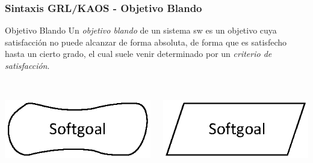 \documentclass[handout,slidestop,xcolor=pst,dvips,blue]{beamer}
\begin{document}
\begin{frame}[c]
    \frametitle{Sintaxis GRL/KAOS - Objetivo Blando}
    \begin{block}{Objetivo Blando}
        Un \alert{\emph{objetivo blando}} de un sistema sw es un objetivo cuya satisfacción no puede alcanzar de forma absoluta, de forma que es satisfecho hasta un cierto grado, el cual suele venir determinado por un \emph{criterio de satisfacción}.
        \ \\
        \ \\
        \begin{columns}[c]
            \begin{column}{0.50\linewidth}
                \centering \includegraphics[width=0.5\columnwidth,keepaspectratio=true]{images/objetivos/softgoal(GRL).eps}
            \end{column}
            \begin{column}{0.50\linewidth}
                \centering \includegraphics[width=0.5\columnwidth,keepaspectratio=true]{images/objetivos/softgoal(KAOS).eps}
            \end{column}
        \end{columns}
    \end{block}
\end{frame}
\end{document}
